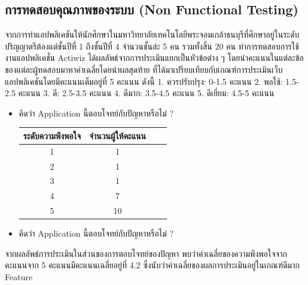 \documentclass[14pt,oneside,openright,a4paper]{cpe-thai-project}
\begin{document}
\newpage
\subsection{การทดสอบคุณภาพของระบบ (Non Functional Testing)}
จากการทําแอปพลิเคชันให้นักศึกษาในมหาวิทยาลัยเทคโนโลยีพระจอมเกล้าธนบุรีที่ศึกษาอยู่ในระดับปริญญาตรีต้องแต่ชั้นปีที่ 1 ถึงชั้นปีที่ 4 จำนวนชั้นล่ะ 5 คน รวมทั้งสิ้น 20 คน ทำการทดสอบการใช้งานแอปพลิเคชั่น Actiwiz ได้ผลลัพธ์จากการประเมินแยกเป็นหัวข้อต่าง ๆ โดยนําคะแนนในแต่ละข้อของแต่ละผู้ทดสอบมาหาค่าเฉลี่ยโดยนําผลสุดท้าย
ที่ได้มาเปรียบเทียบกับเกณฑ์การประเมินเว็บแอปพลิเคชันโดยมีคะแนนเต็มอยู่ที่ 5 คะแนน ดังนี้
1. ควรปรับปรุง: 0-1.5 คะแนน
2. พอใช้: 1.5-2.5 คะแนน
3. ดี: 2.5-3.5 คะแนน
4. ดีมาก: 3.5-4.5 คะแนน
5. ดีเยี่ยม: 4.5-5 คะแนน
\begin{itemize}
  \item คิดว่า Application นี้ตอบโจทย์กับปัญหาหรือไม่ ?
  \begin{table}[!h]
    \centering
    \captionsetup{justification=centering} %
    \begin{tabular}{|c|c|c|c|}
      \hline
      \multicolumn{1}{|c|}{\cellcolor[HTML]{9FC5E8}ระดับความพึงพอใจ} &
        \multicolumn{1}{c|}{\cellcolor[HTML]{9FC5E8}จำนวนผู้ให้คะแนน} \\ \hline
       1 & 1
         \\ \hline 
       2 & 1
         \\ \hline 
       3 & 1
         \\ \hline 
       4 & 7
         \\ \hline 
       5 & 10
         \\ \hline
    \end{tabular}
    \label{tab:Problemssolvingsatisfaction}
  \end{table}
  \item คิดว่า Application นี้ตอบโจทย์กับปัญหาหรือไม่ ?
\end{itemize}
จากผลลัพธ์การประเมินในส่วนของการตอบโจทย์ของปัญหา พบว่าค่าเฉลี่ยของความพึงพอใจจากคะแนนจาก 5 คะแนนมีคะแนนเฉลี่ยอยู่ที่ 4.2 ซึ่งนับว่าค่าเฉลี่ยของผลการประเมินอยู่ในเกณฑ์ดีมาก
  Feature
\end{document}
